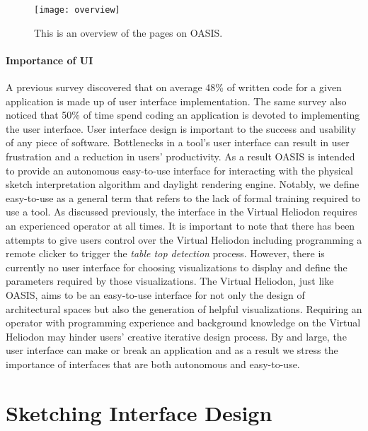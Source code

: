 \begin{figure}[h]
\centering
\texttt{[image: overview]}
\caption{This is an overview of the pages on OASIS.}
\label{fig:overview}
\end{figure}

\paragraph{Importance of UI}\label{ui_importance}
A previous survey discovered that on average 48\% of written code for a given application is made up of user interface implementation\cite{Myers1992}.
The same survey also noticed that 50\% of time spend coding an application is devoted to implementing the user interface\cite{Myers1992}.
User interface design is important to the success and usability of any piece of software.
Bottlenecks in a tool's user interface can result in user frustration and a reduction in users' productivity.
As a result OASIS is intended to provide an autonomous easy-to-use interface for interacting with the physical sketch interpretation algorithm and daylight rendering engine.
Notably, we define easy-to-use  as a general term that refers to the lack of formal training required to use a tool.
As discussed previously, the interface in the Virtual Heliodon requires an experienced operator at all times.
It is important to note that there has been attempts to give users control over the Virtual Heliodon including programming a remote clicker to trigger the \textit{table top detection} process.
However, there is currently no user interface for choosing visualizations to display and define the parameters required by those visualizations.
The Virtual Heliodon, just like OASIS, aims to be an easy-to-use interface for not only the design of architectural spaces but also the generation of helpful visualizations.
Requiring an operator with programming experience and background knowledge on the Virtual Heliodon may hinder users' creative iterative design process.
By and large, the user interface can make or break an application and as a result we stress the importance of interfaces that are both autonomous and easy-to-use.

\section{Sketching Interface Design}

